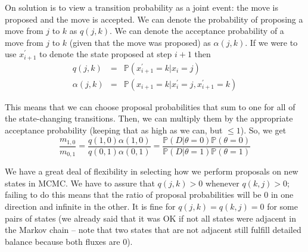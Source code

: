 \documentclass[11pt]{article}
\newcommand{\prop}[2]{q(#1,#2)}
\newcommand{\accept}[2]{\alpha({#1,#2})}
\renewcommand{\Pr}{{\mathbb P}}
\begin{document}
On solution is to view a transition probability as a joint event: the move is proposed and the move is accepted.
We can denote the probability of proposing a move from $j$ to $k$ as $\prop{j}{k}$.  
We can denote the acceptance probability of a move from $j$ to $k$ (given that the move was proposed) as $\accept{j}{k}$.
If we were to use $x_{i+1}^{\prime}$ to denote the state proposed at step $i+1$ then
\begin{eqnarray*}
	\prop{j}{k} & = & \Pr(x_{i+1}^{\prime}=k|x_{i}=j) \\
	\accept{j}{k} & = & \Pr(x_{i+1}=k | x_{i}^{\prime}=j, x_{i+1}^{\prime}=k)
\end{eqnarray*}


This means that we can choose proposal probabilities that sum to one for all of the state-changing transitions.
Then, we can multiply them by the appropriate acceptance probability (keeping that as high as we can, but $\leq 1$).
So, we get
\begin{equation}\frac{m_{1,0}}{m_{0,1}} = \frac{\prop{1}{0}\accept{1}{0}}{\prop{0}{1}\accept{0}{1}} = \frac{\Pr(D|\theta=0)\Pr(\theta=0)}{\Pr(D|\theta=1)\Pr(\theta=1)} \label{moveToPropAccept}\end{equation}

We have a great deal of flexibility in selecting how we perform proposals on new states in MCMC.
We have to assure that $\prop{j}{k} > 0$ whenever $\prop{k}{j} > 0$; failing to do this means that the ratio of proposal probabilities will be 0 in one direction and infinite in the other.
It is fine for $\prop{j}{k} = \prop{k}{j} = 0$ for some pairs of states (we already said that it was OK if not all states were adjacent in the Markov chain -- note that two states that are not adjacent still fulfill detailed balance because both fluxes are 0).
\end{document}
